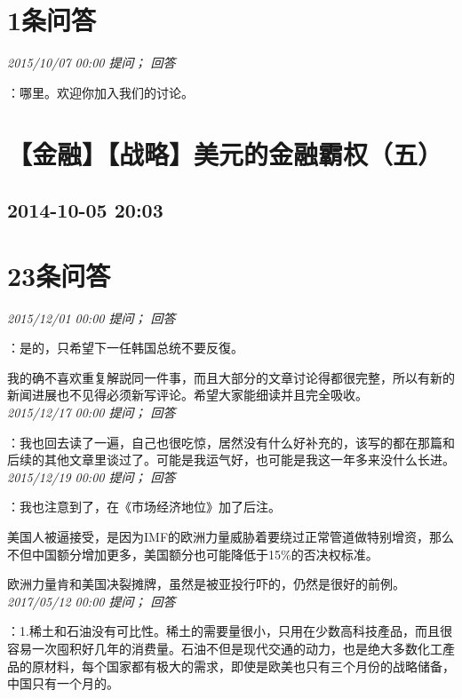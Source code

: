 \documentclass[twocolumn]{ctexart}
\begin{document}
\section{1条问答}

\textit{\hfill\noindent\small 2015/10/07 00:00 提问； 回答}

：哪里。欢迎你加入我们的讨论。\\


\section{【金融】【战略】美元的金融霸权（五）}
\subsection{2014-10-05 20:03}


\section{23条问答}

\textit{\hfill\noindent\small 2015/12/01 00:00 提问； 回答}

：是的，只希望下一任韩国总统不要反復。

我的确不喜欢重复解説同一件事，而且大部分的文章讨论得都很完整，所以有新的新闻进展也不见得必须新写评论。希望大家能细读并且完全吸收。\\

\textit{\hfill\noindent\small 2015/12/17 00:00 提问； 回答}

：我也回去读了一遍，自己也很吃惊，居然没有什么好补充的，该写的都在那篇和后续的其他文章里谈过了。可能是我运气好，也可能是我这一年多来没什么长进。\\

\textit{\hfill\noindent\small 2015/12/19 00:00 提问； 回答}

：我也注意到了，在《市场经济地位》加了后注。

美国人被逼接受，是因为IMF的欧洲力量威胁着要绕过正常管道做特别增资，那么不但中国额分增加更多，美国额分也可能降低于15\%的否决权标准。

欧洲力量肯和美国决裂摊牌，虽然是被亚投行吓的，仍然是很好的前例。\\

\textit{\hfill\noindent\small 2017/05/12 00:00 提问； 回答}

：1.稀土和石油没有可比性。稀土的需要量很小，只用在少数高科技產品，而且很容易一次囤积好几年的消费量。石油不但是现代交通的动力，也是绝大多数化工產品的原材料，每个国家都有极大的需求，即使是欧美也只有三个月份的战略储备，中国只有一个月的。
\end{document}
